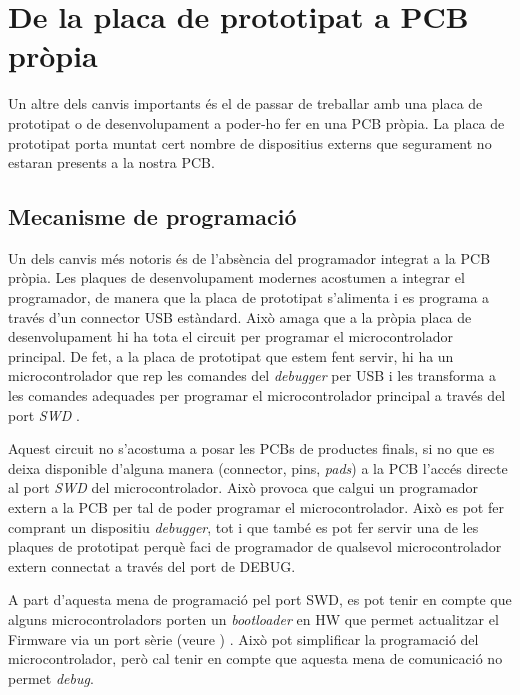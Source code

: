 \section{De la placa de prototipat a PCB pròpia}
Un altre dels canvis importants és el de passar de treballar amb una placa de prototipat o de desenvolupament a poder-ho fer en una PCB pròpia. La placa de prototipat porta muntat cert nombre de dispositius externs que segurament no estaran presents a la nostra PCB.

\subsection{Mecanisme de programació}
Un dels canvis més notoris és de l'absència del programador integrat a la PCB pròpia. Les plaques de desenvolupament modernes acostumen a integrar el programador, de manera que la placa de prototipat s'alimenta i es programa a través d'un connector USB estàndard. Això amaga que a la pròpia placa de desenvolupament hi ha tota el circuit per programar el microcontrolador principal. De fet, a la placa de prototipat que estem fent servir, hi ha un microcontrolador que rep les comandes del {\em debugger} per USB i les transforma a les comandes adequades per programar el microcontrolador principal a través del port {\em SWD} \cite[30]{USERMANUALDEVKIT}.

Aquest circuit no s'acostuma a posar les PCBs de productes finals, si no que es deixa disponible d'alguna manera (connector, pins, {\em pads}) a la PCB l'accés directe al port {\em SWD} del microcontrolador. Això provoca que calgui un programador extern a la PCB per tal de poder programar el microcontrolador. Això es pot fer comprant un dispositiu {\em debugger}, tot i que també es pot fer servir una de les plaques de prototipat perquè faci de programador de qualsevol microcontrolador extern connectat a través del port de DEBUG.

A part d'aquesta mena de programació pel port SWD, es pot tenir en compte que alguns microcontroladors porten un {\em bootloader} en HW que permet actualitzar el Firmware via un port sèrie (veure ) \cite{AN0003}. Això pot simplificar la programació del microcontrolador, però cal tenir en compte que aquesta mena de comunicació no permet {\em debug}. 


